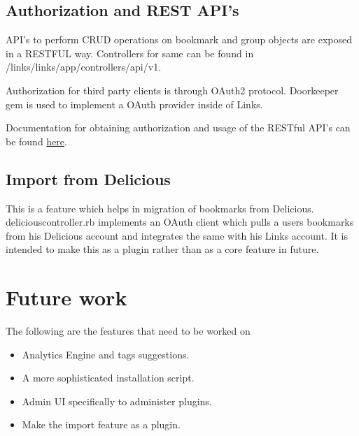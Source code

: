 \documentclass[11pt]{report} %
\begin{document}
\section{Authorization and REST API's}
API's to perform CRUD operations on bookmark and group objects are exposed in a RESTFUL way. Controllers for same can be found in /links/links/app/controllers/api/v1.

Authorization for third party clients is through OAuth2 protocol. Doorkeeper gem is used to implement a OAuth provider inside of Links.

Documentation for obtaining authorization and usage of the RESTful API's can be found  \href{https://bitbucket.org/linkiiitb/links/wiki/Links\%20API\%20documentation}{here}.

\section{Import from Delicious}
This is a feature which helps in migration of bookmarks from Delicious. delicious\textunderscore controller.rb implements an OAuth client which pulls a users bookmarks from his Delicious account and integrates the same with his Links account. It is intended to make this as a plugin rather than as a core feature in future.

\chapter{Future work}
The following are the features that need to be worked on
\begin{itemize}
\item
Analytics Engine and tags suggestions.
\item
A more sophisticated installation script.
\item
Admin UI specifically to administer plugins.
\item
Make the import feature as a plugin.
\end{itemize}
\end{document}
